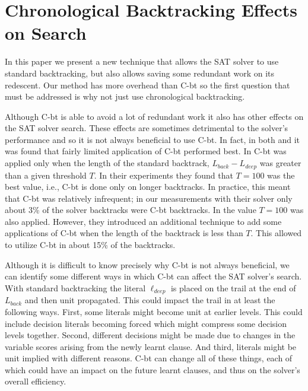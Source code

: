 \documentclass[runningheads]{llncs}
\newcommand{\sat}{SAT\xspace}
\newcommand{\deepestLvl}{L_{\textit{deep}}}
\newcommand{\deepestLit}{\ell_{\textit{deep}}}
\newcommand{\btL}{L_{\textit{back}}}
\newcommand{\cbt}{C-bt\xspace}
\begin{document}
\section{Chronological Backtracking Effects on Search}
In this paper we present a new technique that allows the \sat solver
to use standard backtracking, but also allows saving some redundant
work on its redescent.  Our method has more overhead than \cbt so the
first question that must be addressed is why not just use
chronological backtracking.

Although \cbt is able to avoid a lot of redundant work it also has
other effects on the \sat solver search. These effects are sometimes
detrimental to the solver's performance and so it is not always
beneficial to use \cbt. In fact, in both \cite{DBLP:conf/sat/NadelR18}
and \cite{DBLP:conf/sat/MohleB19} it was found that fairly limited
application of \cbt performed best. In \cite{DBLP:conf/sat/NadelR18}
\cbt was applied only when the length of the standard backtrack,
$\btL-\deepestLvl$ was greater than a given threshold $T$. In their
experiments they found that $T=100$ was the best value, i.e., \cbt is
done only on longer backtracks. In practice, this meant that \cbt was
relatively infrequent; in our measurements with their solver only
about 3\% of the solver backtracks were \cbt backtracks. In
\cite{DBLP:conf/sat/MohleB19} the value $T=100$ was also
applied. However, they introduced an additional technique to add some
applications of \cbt when the length of the backtrack is less than
$T$. This allowed \cite{DBLP:conf/sat/MohleB19} to utilize \cbt in
about 15\% of the backtracks.

Although it is difficult to know precisely why \cbt is not always
beneficial, we can identify some different ways in which \cbt can
affect the \sat solver's search. With standard backtracking the
literal $\deepestLit$ is placed on the trail at the end of $\btL$ and
then unit propagated. This could impact the trail in at least the
following ways. First, some literals might become unit at earlier
levels. This could include decision literals becoming forced which
might compress some decision levels together. Second, different
decisions might be made due to changes in the variable scores arising
from the newly learnt clause. And third, literals might be unit
implied with different reasons. \cbt can change all of these things,
each of which could have an impact on the future learnt clauses, and
thus on the solver's overall efficiency.
\end{document}
